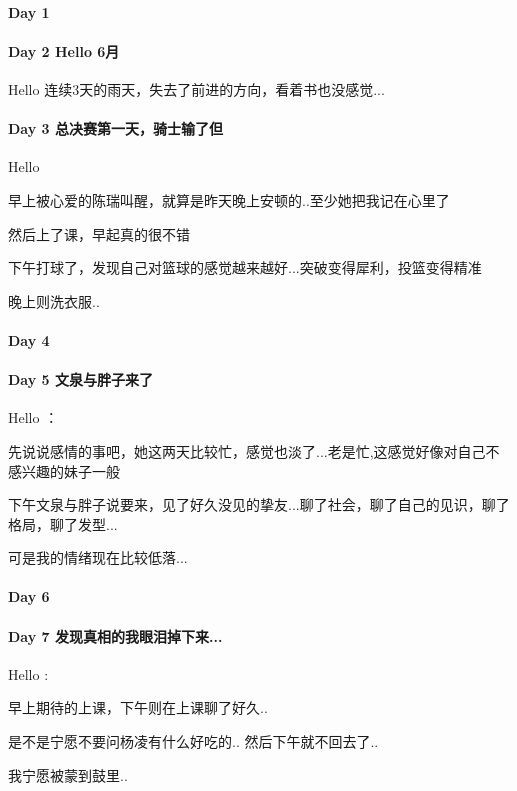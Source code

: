 \documentclass[UTF8,a4paper,8pt]{ctexbook}
\begin{document}
 	 \paragraph{Day 1       \quad     }
 	 \paragraph{Day 2   Hello 6月    \quad     }
	 	 Hello 连续3天的雨天，失去了前进的方向，看着书也没感觉...
 	 \paragraph{Day 3  总决赛第一天，骑士输了但     \quad     }
	 	 Hello 
	 	 
	 	 早上被心爱的陈瑞叫醒，就算是昨天晚上安顿的..至少她把我记在心里了
	 	 
	 	 然后上了课，早起真的很不错
	 	 
	 	 下午打球了，发现自己对篮球的感觉越来越好...突破变得犀利，投篮变得精准
	 	 
	 	 晚上则洗衣服..
	 	 
	 	 
 	 \paragraph{Day 4       \quad     }
 	 \paragraph{Day 5   文泉与胖子来了   \quad     }
	 	 Hello ：
	 	 
	 	 先说说感情的事吧，她这两天比较忙，感觉也淡了...老是忙,这感觉好像对自己不感兴趣的妹子一般
	 	 
	 	 下午文泉与胖子说要来，见了好久没见的挚友...聊了社会，聊了自己的见识，聊了格局，聊了发型...
	 	 
	 	 可是我的情绪现在比较低落...
 	 \paragraph{Day 6       \quad     }
 	 \paragraph{Day 7   发现真相的我眼泪掉下来... \quad     }
	 	 Hello :
	 	 
	 	 早上期待的上课，下午则在上课聊了好久..
	 	 
	 	 是不是宁愿不要问杨凌有什么好吃的.. 然后下午就不回去了..
	 	 
	 	 我宁愿被蒙到鼓里..
	 	 
\end{document}
